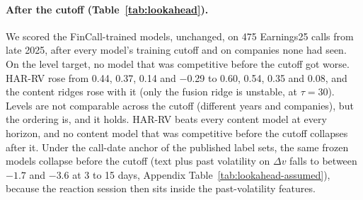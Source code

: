 \paragraph{After the cutoff (Table~\ref{tab:lookahead}).}
We scored the FinCall-trained models, unchanged, on 475 Earnings25 calls from late
2025, after every model's training cutoff and on companies none had seen. On the
level target, no model that was competitive before the cutoff got worse. HAR-RV
rose from 0.44, 0.37, 0.14 and $-$0.29 to 0.60, 0.54, 0.35 and 0.08, and the
content ridges rose with it (only the fusion ridge is unstable, at $\tau{=}30$).
Levels are not comparable across the cutoff (different years and companies), but
the ordering is, and it holds. HAR-RV beats every content model at every horizon,
and no content model that was competitive before the cutoff collapses after it.
Under the call-date anchor of the published label sets, the same frozen models
collapse before the cutoff (text plus past volatility on $\Delta v$ falls to
between $-1.7$ and $-3.6$ at 3 to 15 days, Appendix
Table~\ref{tab:lookahead-assumed}), because
the reaction session then sits inside the past-volatility features.


